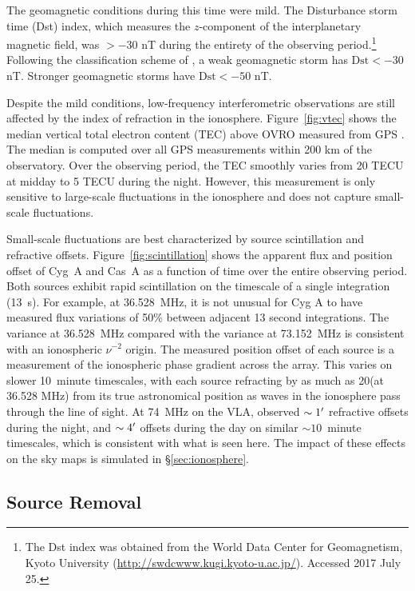 \documentclass[twocolumn]{aastex61}
\begin{document}
The geomagnetic conditions during this time were mild. The Disturbance storm time (Dst) index, which
measures the $z$-component of the interplanetary magnetic field, was
$>-30$ nT during the entirety of the observing period.\footnote{
    The Dst index was obtained from the World Data Center for Geomagnetism, Kyoto University
    (\url{http://swdcwww.kugi.kyoto-u.ac.jp/}). Accessed 2017 July 25.
}
Following the classification scheme of \citet{2008GMS...181.....K}, a weak geomagnetic storm has
$\text{Dst} < -30$ nT. Stronger geomagnetic storms have $\text{Dst} < -50$ nT.

Despite the mild conditions, low-frequency interferometric observations are still affected by the
index of refraction in the ionosphere.  Figure~\ref{fig:vtec} shows the median vertical total
electron content (TEC) above OVRO measured from GPS \citep{1999JASTP..61.1205I}. The median is
computed over all GPS measurements within 200 km of the observatory. Over the observing period, the
TEC smoothly varies from 20 TECU at midday to 5 TECU during the night. However, this measurement is
only sensitive to large-scale fluctuations in the ionosphere and does not capture small-scale
fluctuations.

Small-scale fluctuations are best characterized by source scintillation and refractive offsets.
Figure~\ref{fig:scintillation} shows the apparent flux and position offset of Cyg~A and Cas~A as a
function of time over the entire observing period. Both sources exhibit rapid scintillation on the
timescale of a single integration (13~s). For example, at 36.528~MHz, it is not unusual for
Cyg A to have measured flux variations of 50\% between adjacent 13 second integrations.  The
variance at 36.528~MHz compared with the variance at 73.152~MHz is consistent with an ionospheric
$\nu^{-2}$ origin. The measured position offset of each source is a measurement of the ionospheric
phase gradient across the array.  This varies on slower 10~minute timescales, with each source
refracting by as much as 20\arcmin (at 36.528 MHz) from its true astronomical position as waves
in the ionosphere pass through the line of sight. At 74~MHz on the VLA, \citet{2007ApJS..172..686K}
observed $\sim 1\mbox{$^\prime$}$ refractive offsets during the night, and $\sim 4\mbox{$^\prime$}$ offsets during the
day on similar $\sim10$~minute timescales, which is consistent with what is seen here.  The impact
of these effects on the sky maps is simulated in \S\ref{sec:ionosphere}.

\subsection{Source Removal}\label{sec:source-removal}
\end{document}

